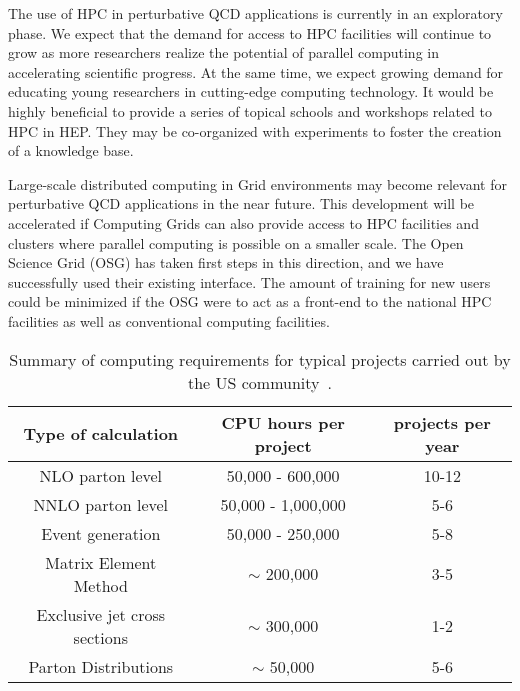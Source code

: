 The use of HPC in perturbative QCD applications is currently in
an exploratory phase. We expect that the demand for access to HPC
facilities will continue to grow as more researchers realize the 
potential of parallel computing in accelerating scientific progress. 
At the same time, we expect growing demand for educating young researchers 
in cutting-edge computing technology. It would be highly beneficial 
to provide a series of topical schools and workshops related 
to HPC in HEP. They may be co-organized with experiments to foster 
the creation of a knowledge base.

Large-scale distributed computing in Grid environments 
may become relevant for perturbative QCD applications 
in the near future. This development will be accelerated if Computing Grids
can also provide access to HPC facilities and clusters where parallel 
computing is possible on a smaller scale. The Open Science Grid (OSG)
has taken first steps in this direction, and we have successfully used their
existing interface. The amount of training for new users could be minimized
if the OSG were to act as a front-end to the national HPC facilities
as well as conventional computing facilities.

\begin{table}
\begin{center}
  \begin{tabular}{ccc}
    \hline
    Type of calculation & CPU hours per project & projects per year \\
    \hline\hline
    NLO parton level & 50,000 - 600,000 & 10-12\\
    NNLO parton level & 50,000 - 1,000,000 & 5-6\\
    Event generation & 50,000 - 250,000 & 5-8\\
    Matrix Element Method & $\sim$ 200,000 & 3-5\\
    Exclusive jet cross sections & $\sim$ 300,000 & 1-2\\
    Parton Distributions & $\sim$ 50,000 & 5-6\\
    \hline
  \end{tabular}
\end{center}
  \caption{Summary of computing requirements for typical projects
    carried out by the US community~\cite{HPCWP}.
    \label{tab:summary}}
\end{table}



